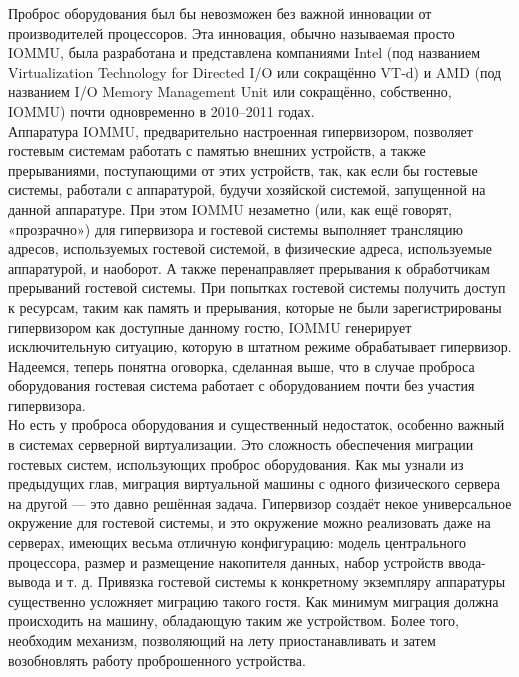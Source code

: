 \documentclass[14pt, a4paper]{article}
\begin{document}
Проброс оборудования был бы невозможен без важной инновации от производителей процессоров.
Эта инновация, обычно называемая просто IOMMU, была разработана и представлена компаниями
Intel (под названием Virtualization Technology for Directed I/O или сокращённо VT-d) и AMD (под
названием I/O Memory Management Unit или сокращённо, собственно, IOMMU) почти одновременно в
2010–2011 годах.\\

Аппаратура IOMMU, предварительно настроенная гипервизором, позволяет гостевым системам
работать с памятью внешних устройств, а также прерываниями, поступающими от этих устройств, так,
как если бы гостевые системы, работали с аппаратурой, будучи хозяйской системой, запущенной на
данной аппаратуре. При этом IOMMU незаметно (или, как ещё говорят, «прозрачно») для гипервизора
и гостевой системы выполняет трансляцию адресов, используемых гостевой системой, в физические
адреса, используемые аппаратурой, и наоборот. А также перенаправляет прерывания к обработчикам
прерываний гостевой системы. При попытках гостевой системы получить доступ к ресурсам, таким как
память и прерывания, которые не были зарегистрированы гипервизором как доступные данному
гостю, IOMMU генерирует исключительную ситуацию, которую в штатном режиме обрабатывает
гипервизор.\\

Надеемся, теперь понятна оговорка, сделанная выше, что в случае проброса оборудования гостевая
система работает с оборудованием почти без участия гипервизора.\\

Но есть у проброса оборудования и существенный недостаток, особенно важный в системах
серверной виртуализации. Это сложность обеспечения миграции гостевых систем, использующих
проброс оборудования. Как мы узнали из предыдущих глав, миграция виртуальной машины с одного
физического сервера на другой — это давно решённая задача. Гипервизор создаёт некое
универсальное окружение для гостевой системы, и это окружение можно реализовать даже на
серверах, имеющих весьма отличную конфигурацию: модель центрального процессора, размер и
размещение накопителя данных, набор устройств ввода-вывода и т. д. Привязка гостевой системы к
конкретному экземпляру аппаратуры существенно усложняет миграцию такого гостя. Как минимум
миграция должна происходить на машину, обладающую таким же устройством. Более того, необходим
механизм, позволяющий на лету приостанавливать и затем возобновлять работу проброшенного
устройства.\\
\end{document}
